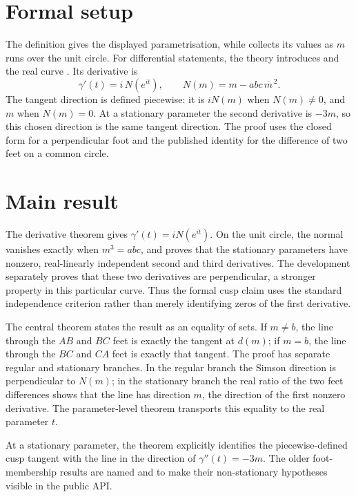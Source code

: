 \documentclass[11pt,a4paper]{article}
\begin{document}
\section{Formal setup}

The definition  gives the displayed
parametrisation, while  collects its values as $m$ runs
over the unit circle.  For differential statements, the theory introduces
 and the real curve
.  Its derivative is
\[
  \gamma'(t)=i\,N(e^{it}),\qquad
  N(m)=m-abc\,\overline m^{\,2}.
\]
The tangent direction is defined piecewise: it is \(iN(m)\) when $N(m)\ne0$,
and $m$ when $N(m)=0$.  At a stationary parameter the second derivative is
$-3m$, so this chosen direction is the same tangent direction.
The proof uses the closed form for a perpendicular foot and the published
identity for the difference of two feet on a common circle.

\section{Main result}

The derivative theorem gives
\(\gamma'(t)=iN(e^{it})\).  On the unit circle, the normal vanishes exactly when
\(m^3=abc\), and
 proves that
the stationary parameters have nonzero, real-linearly independent second and
third derivatives.  The development separately proves that these two
derivatives are perpendicular, a stronger property in this particular curve.
Thus the formal cusp claim uses the standard independence criterion rather
than merely identifying zeros of the first derivative.

The central theorem
 states the result as
an equality of sets.  If \(m\ne b\), the line through the \(AB\) and \(BC\)
feet is exactly the tangent at \(d(m)\); if \(m=b\), the line through the
\(BC\) and \(CA\) feet is exactly that tangent.  The proof has separate
regular and stationary branches.  In the regular branch the Simson direction
is perpendicular to \(N(m)\); in the stationary branch the real ratio of the
two feet differences shows that the line has direction \(m\), the direction
of the first nonzero derivative.  The parameter-level theorem
 transports this equality
to the real parameter \(t\).

At a stationary parameter, the theorem
 explicitly
identifies the piecewise-defined cusp tangent with the line in the direction
of \(\gamma''(t)=-3m\).  The older foot-membership results are named
 and
 to make their
non-stationary hypotheses visible in the public API.





\end{document}
